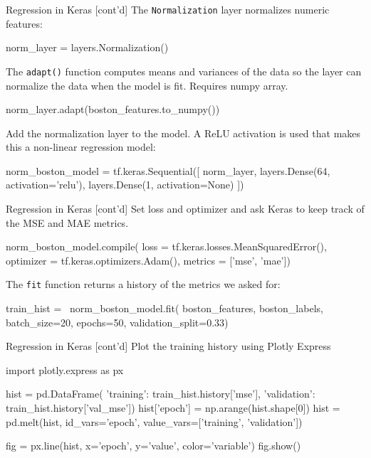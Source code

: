 \documentclass[ignorenonframetext,xcolor=x11names]{beamer}
\begin{document}
\begin{frame}[fragile]{Regression in Keras \small [cont'd]}
The \texttt{Normalization} layer normalizes numeric features:
\begin{pythoncode}
norm_layer = layers.Normalization()
\end{pythoncode}
The \texttt{adapt()} function computes means and variances of the data so the layer can normalize the data when the model is fit. Requires numpy array.
\begin{pythoncode}
norm_layer.adapt(boston_features.to_numpy())
\end{pythoncode}
Add the normalization layer to the model. A ReLU activation is used that makes this a non-linear regression model:
\begin{pythoncode}
norm_boston_model = tf.keras.Sequential([
  norm_layer,
  layers.Dense(64, activation='relu'),
  layers.Dense(1, activation=None)
])
\end{pythoncode}
\end{frame}

\begin{frame}[fragile]{Regression in Keras \small [cont'd]}
Set loss and optimizer and ask Keras to keep track of the MSE and MAE metrics.
\begin{pythoncode}
norm_boston_model.compile(
    loss = tf.keras.losses.MeanSquaredError(),
    optimizer = tf.keras.optimizers.Adam(),
    metrics = ['mse', 'mae'])
\end{pythoncode}
The \texttt{fit} function returns a history of the metrics we asked for:
\begin{pythoncode}    
train_hist = \
    norm_boston_model.fit(
        boston_features, 
        boston_labels, 
        batch_size=20,
        epochs=50,
        validation_split=0.33)
\end{pythoncode}
\end{frame}

\begin{frame}[fragile]{Regression in Keras \small [cont'd]}
Plot the training history using Plotly Express
\begin{pythoncode}
import plotly.express as px

hist = pd.DataFrame({
    'training': train_hist.history['mse'],
    'validation': train_hist.history['val_mse']})
hist['epoch'] = np.arange(hist.shape[0])
hist = pd.melt(hist, 
               id_vars='epoch', 
               value_vars=['training', 'validation'])

fig = px.line(hist, x='epoch', y='value', 
                    color='variable')
fig.show()
\end{pythoncode}
\end{frame}
\end{document}
